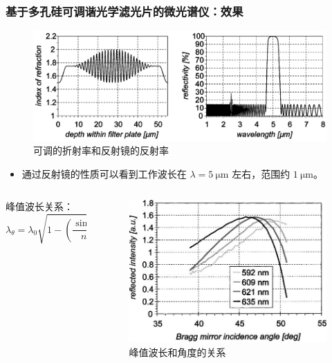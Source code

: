 \begin{frame}[c]
    \frametitle{基于多孔硅可调谐光学滤光片的微光谱仪：效果}
    \begin{figure}[!htb] %
        \centering %
        \includegraphics[width=.75\textwidth]{figures/Microspectrometer based on a tunable optical filter of porous silicon_3.png} %
        \caption{可调的折射率和反射镜的反射率} %
    \end{figure}
    \begin{itemize}
        \item 通过反射镜的性质可以看到工作波长在 $\lambda=5\ \mathrm{\mu m}$ 左右，范围约 $1\ \mathrm{\mu m}$。
    \end{itemize}

    \begin{columns}
        \begin{column}{.5\textwidth}
            峰值波长关系：\[\lambda_{\theta}=\lambda_0\sqrt{1-(\frac{\sin\theta}{n})^2},\ \lambda_0=2dm\]
        \end{column}
        \begin{column}{.5\textwidth}
            \begin{figure}[!htb] %
                \centering %
                \includegraphics[width=.75\textwidth]{figures/Microspectrometer based on a tunable optical filter of porous silicon_4.png} %
                \caption{峰值波长和角度的关系} %
            \end{figure}
        \end{column}
    \end{columns}
\end{frame}